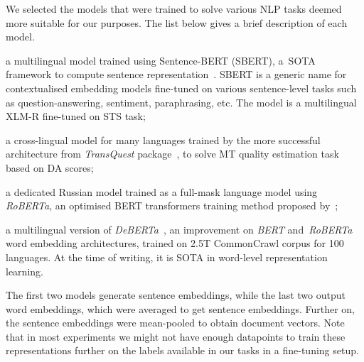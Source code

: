 We selected the models that were trained to solve various NLP tasks deemed more suitable for our purposes. The list below gives a brief description of each model. 
\label{pg:embeddings}
\begin{description}\compresslist{}
	\item[stsb-xlm-r-m:] a multilingual model trained using Sentence-BERT (SBERT), a~\gls{SOTA} framework to compute sentence representation~\cite{Reimers2019}. SBERT is a generic name for contextualised embedding models fine-tuned on various sentence-level tasks such as question-answering, sentiment, paraphrasing, etc. The model is a multilingual XLM-R fine-tuned on \gls{STS} task;
	
	\item[TQmono-m:] a cross-lingual model for many languages trained by the more successful architecture from \textit{TransQuest} package~\cite{Ranasinghe2020}, to solve MT quality estimation task based on DA scores;
	
	\item[ruRoberta:] a dedicated Russian model trained as a full-mask language model using \textit{RoBERTa}, an optimised BERT transformers training method proposed by~\citet{Liu2019};
	
	\item[mdeberta3:] a multilingual version of \textit{DeBERTa}~\cite{He2021}, an improvement on \textit{BERT} and~\textit{RoBERTa} word embedding architectures, trained on 2.5T CommonCrawl corpus for 100 languages. At the time of writing, it is \gls{SOTA} in word-level representation learning. 
\end{description}

The first two models generate sentence embeddings, while the last two output word embeddings, which were averaged to get sentence embeddings. Further on, the sentence embeddings were mean-pooled to obtain document vectors. 
Note that in most experiments we might not have enough datapoints to train these representations further on the labels available in our tasks in a fine-tuning setup. %

